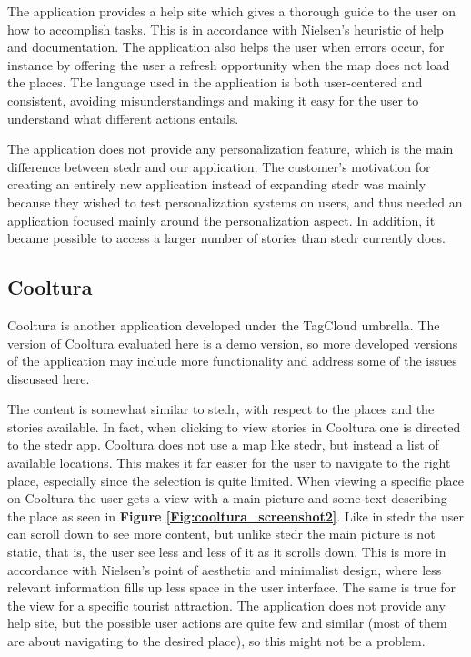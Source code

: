 The application provides a help site which gives a thorough guide to the user on how to accomplish tasks. This is in accordance with Nielsen’s heuristic of help and documentation. The application also helps the user when errors occur, for instance by offering the user a refresh opportunity when the map does not load the places. The language used in the application is both user-centered and consistent, avoiding misunderstandings and making it easy for the user to understand what different actions entails. \newline

The application does not provide any personalization feature, which is the main difference between stedr and our application. The customer’s motivation for creating an entirely new application instead of expanding stedr was mainly because they wished to test personalization systems on users, and thus needed an application focused mainly around the personalization aspect. In addition, it became possible to access a larger number of stories than stedr currently does. 

\subsection{Cooltura}

Cooltura is another application developed under the TagCloud umbrella. The version of Cooltura evaluated here is a demo version, so more developed versions of the application may include more functionality and address some of the issues discussed here. \newline

The content is somewhat similar to stedr, with respect to the places and the stories available. In fact, when clicking to view stories in Cooltura one is directed to the stedr app. Cooltura does not use a map like stedr, but instead a list of available locations. This makes it far easier for the user to navigate to the right place, especially since the selection is quite limited. When viewing a specific place on Cooltura the user gets a view with a main picture and some text describing the place as seen in \textbf{Figure \ref{Fig:cooltura_screenshot2}}. Like in stedr the user can scroll down to see more content, but unlike stedr the main picture is not static, that is, the user see less and less of it as it scrolls down. This is more in accordance with Nielsen’s point of aesthetic and minimalist design, where less relevant information fills up less space in the user interface. The same is true for the view for a specific tourist attraction. The application does not provide any help site, but the possible user actions are quite few and similar (most of them are about navigating to the desired place), so this might not be a problem.\newline

